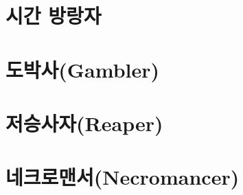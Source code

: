 \documentclass{report}
\begin{document}
	\section{시간 방랑자}
		
		
	\section{도박사(Gambler)}
		
	
	\section{저승사자(Reaper)}
		
	
	\section{네크로맨서(Necromancer)}
		
\end{document}
